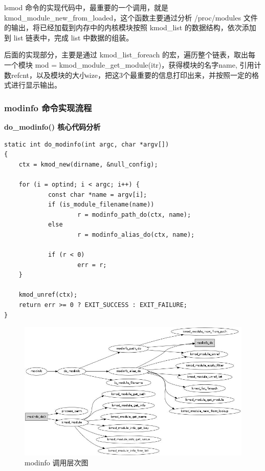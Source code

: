 \documentclass[11pt,a4paper]{article}
\makeatletter
\def\maxwidth{\ifdim\Gin@nat@width>\linewidth\linewidth
\else\Gin@nat@width\fi}
\let\Oldincludegraphics\includegraphics
\renewcommand{\includegraphics}[1]{\Oldincludegraphics[width=\maxwidth]{#1}}
\makeatother
\begin{document}
lsmod 命令的实现代码中，最重要的一个调用，就是
kmod\_module\_new\_from\_loaded，这个函数主要通过分析 /proc/modules
文件的输出，将已经加载到内存中的内核模块按照 kmod\_list
的数据结构，依次添加到 list 链表中，完成 list 中数据的组装。

后面的实现部分，主要是通过 kmod\_list\_foreach
的宏，遍历整个链表，取出每一个模块 mod =
kmod\_module\_get\_module(itr)，获得模块的名字name,
引用计数refcnt，以及模块的大小size，把这3个最重要的信息打印出来，并按照一定的格式进行显示输出。

\subsubsection{modinfo 命令实现流程}

\textbf{do\_modinfo() 核心代码分析}

{\begin{shaded}\begin{verbatim}
static int do_modinfo(int argc, char *argv[])
{
    ctx = kmod_new(dirname, &null_config);

    for (i = optind; i < argc; i++) {
            const char *name = argv[i];
            if (is_module_filename(name))
                    r = modinfo_path_do(ctx, name);
            else
                    r = modinfo_alias_do(ctx, name);

            if (r < 0)
                    err = r;
    }   

    kmod_unref(ctx);
    return err >= 0 ? EXIT_SUCCESS : EXIT_FAILURE;
}
\end{verbatim}\end{shaded}}
\begin{figure}[htbp]
\centering
\includegraphics{./figures/modinfo.jpg}
\caption{modinfo 调用层次图}
\end{figure}
\end{document}

